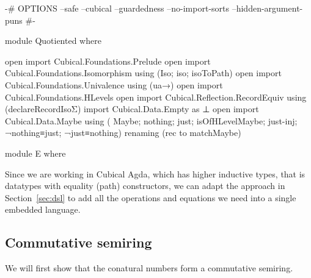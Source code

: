 \begin{code}[hide]
{-# OPTIONS
  --safe
  --cubical
  --guardedness
  --no-import-sorts
  --hidden-argument-puns #-}

module Quotiented where

open import Cubical.Foundations.Prelude
open import Cubical.Foundations.Isomorphism using (Iso; iso; isoToPath)
open import Cubical.Foundations.Univalence using (ua→)
open import Cubical.Foundations.HLevels
open import Cubical.Reflection.RecordEquiv using (declareRecordIsoΣ)
import Cubical.Data.Empty as ⊥
open import Cubical.Data.Maybe
  using
    ( Maybe; nothing; just;
      isOfHLevelMaybe; just-inj; ¬nothing≡just; ¬just≡nothing)
  renaming (rec to matchMaybe)

module E where
\end{code}
Since we are working in Cubical Agda, which has higher inductive types, that is
datatypes with equality (path) constructors, we can adapt the approach in
Section~\ref{sec:dsl} to add all the operations and equations we need into a
single embedded language.

\subsection{Commutative semiring}

We will first show that the conatural numbers form a commutative semiring.


